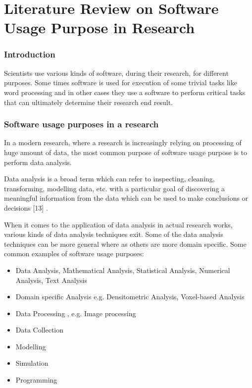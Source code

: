 \section{Literature Review on Software Usage Purpose in Research }
\subsubsection{Introduction}
Scientists use various kinds of software, during their research, for different purposes. Some times software is used for execution of some trivial tasks like word processing and in other cases they use a software to perform critical tasks that can ultimately determine their research end result. 

\subsubsection{Software usage purposes in a research}
In a modern research, where a research is increasingly relying on processing of huge amount of data, the most common purpose of software usage purpose is to perform data analysis. 

Data analysis is a broad term which can refer to inspecting, cleaning, transforming, modelling data, etc. with a particular goal of discovering a meaningful information from the data which can be used to make conclusions or decisions [13] . 

When it comes to the application of data analysis in actual research works, various kinds of data analysis techniques exit. Some of the data analysis techniques can be more general where as others are more domain specific. Some common examples of software usage purposes:
\vspace{-1mm}   %
	\begin{itemize}[noitemsep,topsep=5pt, leftmargin=0.5in] %
		\item Data Analysis, Mathematical Analysis, Statistical Analysis, Numerical Analysis, Text Analysis
		\item Domain specific Analysis e.g. Densitometric Analysis, Voxel-based Analysis
		\item Data Processing , e.g. Image processing
		\item Data Collection
		\item Modelling
		\item Simulation
		\item Programming
		
	\end{itemize}

\clearpage